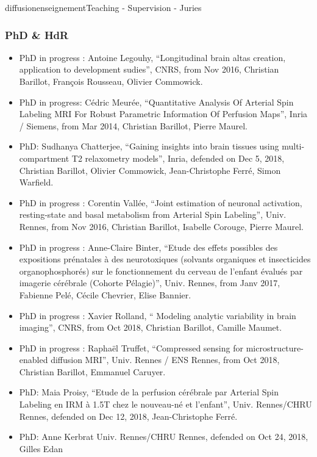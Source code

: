 \documentclass{ra2018}
\begin{document}
\begin{module}{diffusion}{enseignement}{Teaching - Supervision - Juries}
 \subsubsection{PhD \& HdR}
 \begin{itemize}
           \item PhD in progress : Antoine Legouhy, ``Longitudinal brain altas creation, application to development sudies'', CNRS, from Nov 2016, Christian Barillot, François Rousseau, Olivier Commowick.
           \item PhD in progress: Cédric Meurée, ``Quantitative Analysis Of Arterial Spin Labeling MRI For Robust Parametric Information Of Perfusion Maps'', Inria / Siemens, from Mar 2014, Christian Barillot, Pierre Maurel.
	   \item PhD: Sudhanya Chatterjee, ``Gaining insights into brain tissues using multi-compartment T2 relaxometry models'', Inria, defended on Dec 5, 2018, Christian Barillot, Olivier Commowick, Jean-Christophe Ferré, Simon Warfield.
           \item PhD in progress : Corentin Vallée, ``Joint estimation of neuronal activation, resting-state and basal metabolism from Arterial Spin Labeling'', Univ. Rennes, from Nov 2016, Christian Barillot, Isabelle Corouge, Pierre Maurel.
           \item PhD in progress : Anne-Claire Binter, ``Etude des effets possibles des expositions prénatales à des neurotoxiques (solvants organiques et insecticides organophosphorés) sur le fonctionnement du cerveau de l’enfant évalués par imagerie cérébrale (Cohorte Pélagie)'', Univ. Rennes, from Janv 2017, Fabienne Pelé, Cécile Chevrier, Elise Bannier.
           \item PhD in progress : Xavier Rolland, `` Modeling analytic variability in brain imaging'', CNRS, from Oct 2018, Christian Barillot, Camille Maumet.
           \item PhD in progress : Raphaël Truffet, ``Compressed sensing for microstructure-enabled diffusion MRI'', Univ. Rennes / ENS Rennes, from Oct 2018, Christian Barillot, Emmanuel Caruyer.
  	   \item PhD: Maia Proisy, ``Etude de la perfusion cérébrale par Arterial Spin Labeling en IRM à 1.5T chez le nouveau-né et l'enfant'', Univ. Rennes/CHRU Rennes, defended on Dec 12, 2018, Jean-Christophe Ferré. 
	   \item PhD: Anne Kerbrat Univ. Rennes/CHRU Rennes, defended on Oct 24, 2018, Gilles Edan
  \end{itemize}


\end{module}
\end{document}
